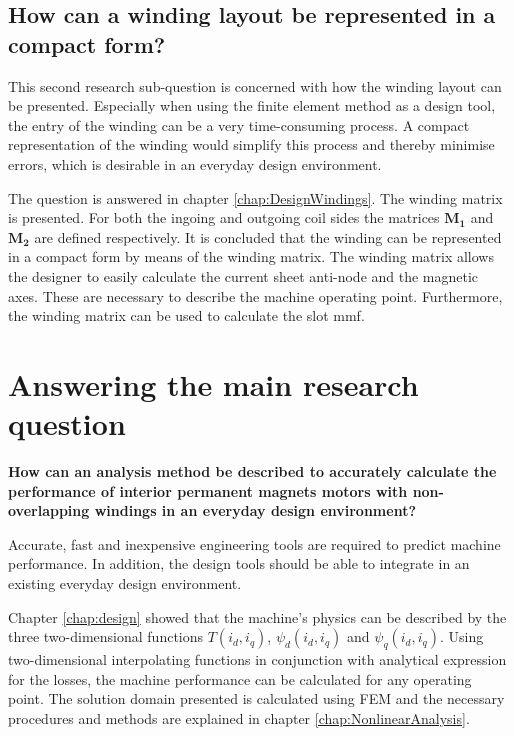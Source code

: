 \subsection{How can a winding layout be represented in a compact form?}
This second research sub-question is concerned with how the winding layout can be presented. Especially when using the finite element method as a design tool, the entry of the winding can be a very time-consuming process. A compact representation of the winding would simplify this process and thereby minimise errors, which is desirable in an everyday design environment.

The question is answered in chapter \ref{chap:DesignWindings}. The winding matrix is presented. For both the ingoing and outgoing coil sides the matrices $\mathbf{M_1}$ and $\mathbf{M_2}$ are defined respectively. It is concluded that the winding can be represented in a compact form by means of the winding matrix. The winding matrix allows the designer to easily calculate the current sheet anti-node and the magnetic axes. These are necessary to describe the machine operating point. Furthermore, the winding matrix can be used to calculate the slot mmf.  

\section{Answering the main research question}
\begin{minipage}{\textwidth}
\vspace{12pt}
\textbf{How can an analysis method be described to accurately calculate the performance of interior permanent magnets motors with non-overlapping windings in an everyday design environment?}
\vspace{12pt}
\end{minipage}
Accurate, fast and inexpensive engineering tools are required to predict machine performance. In addition, the design tools should be able to integrate in an existing  everyday design environment. 

Chapter \ref{chap:design} showed that the machine's physics can be described by the three two-dimensional functions $T(i_d,i_q)$, $\psi_d(i_d,i_q)$ and $\psi_q(i_d,i_q)$. Using two-dimensional interpolating functions in conjunction with analytical expression for the losses, the machine performance can be calculated for any operating point. The solution domain presented is calculated using FEM and the necessary procedures and methods are explained in chapter \ref{chap:NonlinearAnalysis}. 

